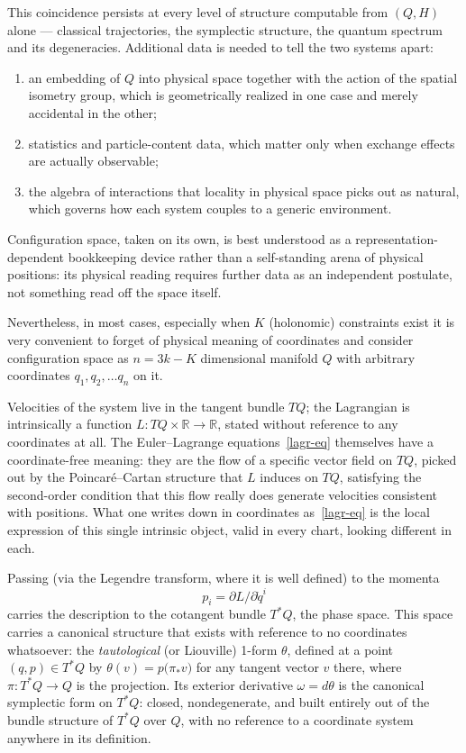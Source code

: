 This coincidence  persists at every
level of structure computable from $(Q,H)$ alone --- classical trajectories,
the symplectic structure, the quantum spectrum and its degeneracies.
Additional data is needed to tell the two systems
apart: 
\begin{enumerate}
   \item an embedding of $Q$ into physical space together with the action of
the spatial isometry group, which is geometrically realized in one case and
merely accidental in the other;
   \item statistics and particle-content data,
which matter only when exchange effects are actually observable;
   \item the
algebra of interactions that locality in physical space picks out as natural,
which governs how each system couples to a generic environment.
\end{enumerate}
Configuration space, taken on its own, is best understood as a
representation-dependent bookkeeping device rather than a self-standing arena
of physical positions: its physical reading requires further data as an
independent postulate, not something read off the space itself.

Nevertheless, in most cases, especially when $K$ (holonomic) constraints 
 exist it is very convenient to forget
of physical meaning of coordinates and consider configuration space as $ n=3 k -K $
dimensional manifold  $ Q $ with arbitrary coordinates $q_1,q_2,\ldots q_n$ on it.

Velocities of the system live in the tangent bundle $TQ$; the Lagrangian is
intrinsically a function $L : TQ\times\mathbb R \to \mathbb R$, stated without
reference to any coordinates at all. The Euler--Lagrange
equations~\eqref{lagr-eq} themselves have a coordinate-free meaning: they are
the flow of a specific vector field on $TQ$, picked out by the
Poincar\'e--Cartan structure that $L$ induces on $TQ$, satisfying the
second-order condition that this flow really does generate velocities
consistent with positions. What one writes down in coordinates
as~\eqref{lagr-eq} is the local expression of this single intrinsic object,
valid in every chart, looking different in each.

Passing (via the Legendre transform, where it is well defined) to
the momenta 
\begin{equation}
   \label {gen-mom}
   p_i = \partial L/\partial \dot q^i
\end{equation}
carries the
description to the cotangent bundle $T^*Q$, the phase space. This
space carries a canonical structure that exists with reference to no
coordinates whatsoever: the \emph{tautological} (or Liouville) 1-form
$\theta$, defined at a point $(q,p)\in T^*Q$ by $\theta(v) =
p\bigl(\pi_*v\bigr)$ for any tangent vector $v$ there, where $\pi:
T^*Q\to Q$ is the projection. Its exterior derivative $\omega =
d\theta$ is the canonical symplectic form on $T^*Q$: closed,
nondegenerate, and built entirely out of the bundle structure of
$T^*Q$ over $Q$, with no reference to a coordinate system anywhere in
its definition.

